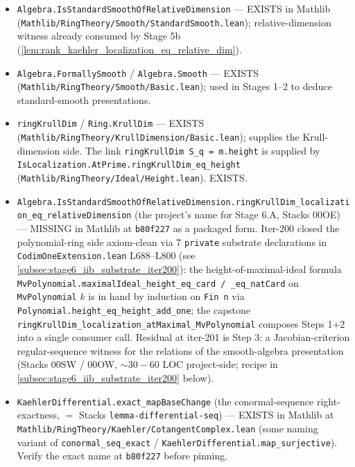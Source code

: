 \begin{itemize}
  \item \texttt{Algebra.IsStandardSmoothOfRelativeDimension} --- EXISTS
    in Mathlib (\texttt{Mathlib/RingTheory/Smooth/StandardSmooth.lean});
    relative-dimension witness already consumed by Stage 5b
    (\cref{lem:rank_kaehler_localization_eq_relative_dim}).
  \item \texttt{Algebra.FormallySmooth} / \texttt{Algebra.Smooth} ---
    EXISTS (\texttt{Mathlib/RingTheory/Smooth/Basic.lean}); used in
    Stages 1--2 to deduce standard-smooth presentations.
  \item \texttt{ringKrullDim} / \texttt{Ring.KrullDim} --- EXISTS
    (\texttt{Mathlib/RingTheory/KrullDimension/Basic.lean}); supplies
    the Krull-dimension side. The link
    \texttt{ringKrullDim S\_q = m.height} is supplied by
    \texttt{IsLocalization.AtPrime.ringKrullDim\_eq\_height}
    (\texttt{Mathlib/RingTheory/Ideal/Height.lean}). EXISTS.
  \item \texttt{Algebra.IsStandardSmoothOfRelativeDimension.\linebreak ringKrullDim\_localization\_eq\_relativeDimension}
    (the project's name for Stage 6.A, Stacks 00OE) --- MISSING in
    Mathlib at \texttt{b80f227} as a packaged form. Iter-200 closed the
    polynomial-ring side axiom-clean via 7 \texttt{private} substrate
    declarations in \texttt{CodimOneExtension.lean} L688--L800 (see
    \ref{subsec:stage6_iib_substrate_iter200}): the height-of-maximal-ideal
    formula \texttt{MvPolynomial.maximalIdeal\_height\_eq\_card / \_eq\_natCard}
    on \texttt{MvPolynomial} \(k\) is in hand by induction on \texttt{Fin n}
    via \texttt{Polynomial.height\_eq\_height\_add\_one}; the capstone
    \texttt{ringKrullDim\_localization\_atMaximal\_MvPolynomial} composes
    Steps 1+2 into a single consumer call. Residual at iter-201 is
    Step 3: a Jacobian-criterion regular-sequence witness for the
    relations of the smooth-algebra presentation (Stacks 00SW / 00OW,
    \(\sim 30-60\) LOC project-side; recipe in
    \ref{subsec:stage6_iib_substrate_iter200} below).
  \item \texttt{KaehlerDifferential.exact\_mapBaseChange} (the
    conormal-sequence right-exactness, \(=\) Stacks
    \texttt{lemma-differential-seq}) --- EXISTS in Mathlib at
    \texttt{Mathlib/RingTheory/Kaehler/CotangentComplex.lean} (some
    naming variant of \texttt{conormal\_seq\_exact} /
    \texttt{KaehlerDifferential.map\_surjective}). Verify the exact name
    at \texttt{b80f227} before pinning.

\end{itemize}
